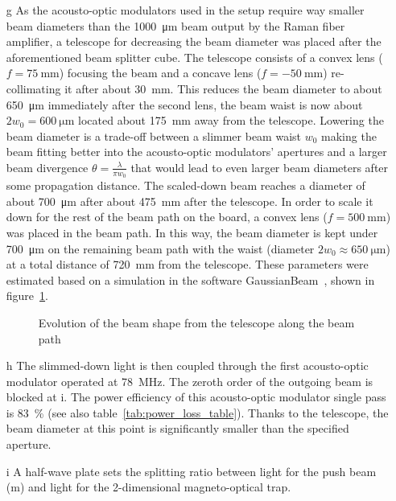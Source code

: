 \begin{itemize}
    \item[g] As the acousto-optic modulators used in the setup require way smaller beam diameters than the \SI{1000}{\micro\meter} beam output by the Raman fiber amplifier, a telescope for decreasing the beam diameter was placed after the aforementioned beam splitter cube. The telescope consists of a convex lens ($f = \SI{75}{\milli\meter}$) focusing the beam and a concave lens ($f = \SI{-50}{\milli\meter}$) re-collimating it after about \SI{30}{\milli\meter}. This reduces the beam diameter to about \SI{650}{\micro\meter} immediately after the second lens, the beam waist is now about $2w_0 = \SI{600}{\micro\meter}$ located about \SI{175}{\milli\meter} away from the telescope. Lowering the beam diameter is a trade-off between a slimmer beam waist $w_0$ making the beam fitting better into the acousto-optic modulators' apertures and a larger beam divergence $\theta = \frac{\lambda}{\pi w_0}$ that would lead to even larger beam diameters after some propagation distance. The scaled-down beam reaches a diameter of about \SI{700}{\micro\meter} after about \SI{475}{\milli\meter} after the telescope. In order to scale it down for the rest of the beam path on the board, a convex lens ($f = \SI{500}{\milli\meter}$) was placed in the beam path. In this way, the beam diameter is kept under \SI{700}{\micro\meter} on the remaining beam path with the waist (diameter $2w_0 \approx \SI{650}{\micro\meter}$) at a total distance of \SI{720}{\milli\meter} from the telescope.  These parameters were estimated based on a simulation in the software GaussianBeam~\cite{noauthor_gaussianbeam_nodate}, shown in figure~\ref{fig:beam_diameter_evolution}.

\begin{figure}
    \caption{Evolution of the beam shape from the telescope along the beam path}
    \label{fig:beam_diameter_evolution}
\end{figure}

    \item[h] The slimmed-down light is then coupled through the first acousto-optic modulator operated at \SI{+78}{\mega\hertz}. The zeroth order of the outgoing beam is blocked at i. The power efficiency of this acousto-optic modulator single pass is \SI{83}{\percent} (see also table~\ref{tab:power_loss_table}). Thanks to the telescope, the beam diameter at this point is significantly smaller than the specified aperture.
    
    \item[i] A half-wave plate sets the splitting ratio between light for the push beam (m) and light for the 2-dimensional magneto-optical trap.
    

\end{itemize}
